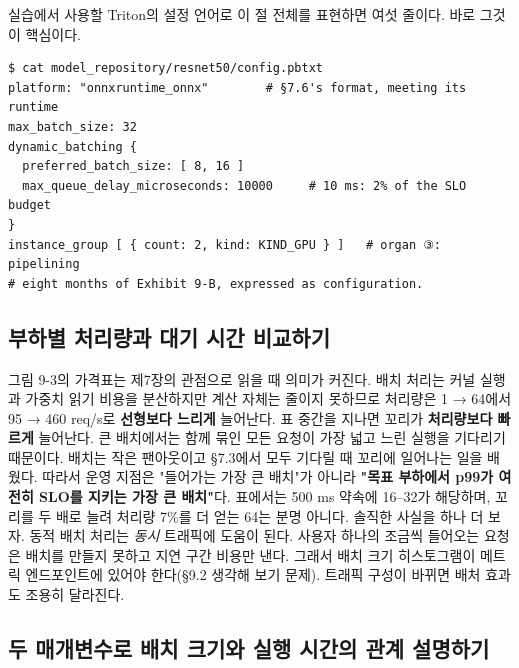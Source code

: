 실습에서 사용할 Triton의 설정 언어로 이 절 전체를 표현하면 여섯 줄이다. 바로 그것이 핵심이다.

\begin{terminalbox}
\begin{Verbatim}[breaklines=true,breakanywhere=true,fontsize=\small,formatcom=\color{tbbtermfg},codes=\tbbcodeactive]
$ cat model_repository/resnet50/config.pbtxt
platform: "onnxruntime_onnx"        # §7.6's format, meeting its runtime
max_batch_size: 32
dynamic_batching {
  preferred_batch_size: [ 8, 16 ]
  max_queue_delay_microseconds: 10000     # 10 ms: 2% of the SLO budget
}
instance_group [ { count: 2, kind: KIND_GPU } ]   # organ ③: pipelining
# eight months of Exhibit 9-B, expressed as configuration.
\end{Verbatim}
\end{terminalbox}

\subsection*{부하별 처리량과 대기 시간 비교하기}

그림 9-3의 가격표는 제7장의 관점으로 읽을 때 의미가 커진다. 배치 처리는 커널 실행과 가중치 읽기 비용을 분산하지만 계산 자체는 줄이지 못하므로 처리량은 1 → 64에서 95 → 460 req/s로 \textbf{선형보다 느리게} 늘어난다. 표 중간을 지나면 꼬리가 \textbf{처리량보다 빠르게} 늘어난다. 큰 배치에서는 함께 묶인 모든 요청이 가장 넓고 느린 실행을 기다리기 때문이다. 배치는 작은 팬아웃이고 §7.3에서 모두 기다릴 때 꼬리에 일어나는 일을 배웠다. 따라서 운영 지점은 "들어가는 가장 큰 배치"가 아니라 \textbf{"목표 부하에서 p99가 여전히 SLO를 지키는 가장 큰 배치"}다. 표에서는 500 ms 약속에 16–32가 해당하며, 꼬리를 두 배로 늘려 처리량 7\%를 더 얻는 64는 분명 아니다. 솔직한 사실을 하나 더 보자. 동적 배치 처리는 \textit{동시} 트래픽에 도움이 된다. 사용자 하나의 조금씩 들어오는 요청은 배치를 만들지 못하고 지연 구간 비용만 낸다. 그래서 배치 크기 히스토그램이 메트릭 엔드포인트에 있어야 한다(§9.2 생각해 보기 문제). 트래픽 구성이 바뀌면 배처 효과도 조용히 달라진다.

\subsection*{두 매개변수로 배치 크기와 실행 시간의 관계 설명하기}

